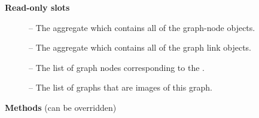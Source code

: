 {\bf Read-only slots}

\begin{description}
\item[]  -- The aggregate which contains all of the graph-node objects.

\item[]  -- The aggregate which contains all of the graph link objects.

\item[]  -- The list of graph nodes corresponding to the
.

\item[]  -- The list of  graphs that
                      are images of this graph.
\end{description}


{\bf Methods} (can be overridden)


